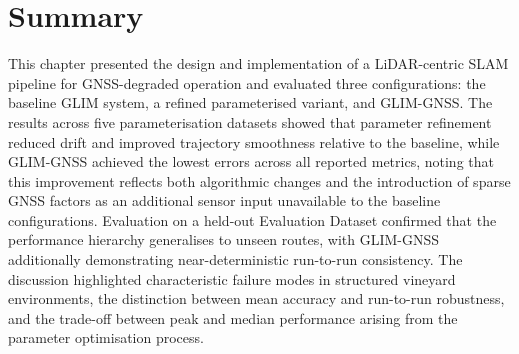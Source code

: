 \section{Summary}
\label{sec:slam-summary}

This chapter presented the design and implementation of a LiDAR-centric SLAM pipeline for GNSS-degraded operation and evaluated three configurations: the baseline GLIM system, a refined parameterised variant, and GLIM-GNSS. The results across five parameterisation datasets showed that parameter refinement reduced drift and improved trajectory smoothness relative to the baseline, while GLIM-GNSS achieved the lowest errors across all reported metrics, noting that this improvement reflects both algorithmic changes and the introduction of sparse GNSS factors as an additional sensor input unavailable to the baseline configurations. Evaluation on a held-out Evaluation Dataset confirmed that the performance hierarchy generalises to unseen routes, with GLIM-GNSS additionally demonstrating near-deterministic run-to-run consistency. The discussion highlighted characteristic failure modes in structured vineyard environments, the distinction between mean accuracy and run-to-run robustness, and the trade-off between peak and median performance arising from the parameter optimisation process.